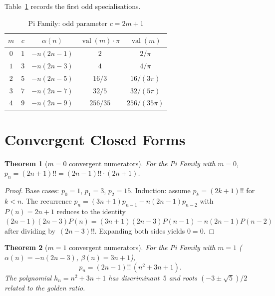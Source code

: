 \documentclass[11pt,a4paper]{article}
\theoremstyle{plain}
\newtheorem{theorem}{Theorem}[section]
\theoremstyle{definition}
\theoremstyle{remark}
\newcommand{\dff}[1]{(#1)!!}
\begin{document}
Table~\ref{tab:pi} records the first odd specialisations.

\begin{table}[ht]
\centering
\caption{Pi Family: odd parameter $c = 2m{+}1$}\label{tab:pi}
\begin{tabular}{@{}ccccc@{}}
\toprule
$m$ & $c$ & $\alpha(n)$ & $\operatorname{val}(m)\cdot\pi$ &
$\operatorname{val}(m)$ \\
\midrule
$0$ & $1$ & $-n(2n{-}1)$ & $2$ & $2/\pi$ \\
$1$ & $3$ & $-n(2n{-}3)$ & $4$ & $4/\pi$ \\
$2$ & $5$ & $-n(2n{-}5)$ & $16/3$ & $16/(3\pi)$ \\
$3$ & $7$ & $-n(2n{-}7)$ & $32/5$ & $32/(5\pi)$ \\
$4$ & $9$ & $-n(2n{-}9)$ & $256/35$ & $256/(35\pi)$ \\
\bottomrule
\end{tabular}
\end{table}

\section{Convergent Closed Forms}\label{sec:closed}

\begin{theorem}[$m=0$ convergent numerators]\label{thm:conv0}
For the Pi Family with $m=0$,
$p_n = (2n{+}1)!! = \dff{2n{-}1}\cdot(2n{+}1)$.
\end{theorem}

\begin{proof}
Base cases: $p_0{=}1$, $p_1{=}3$, $p_2{=}15$.
Induction: assume $p_k = (2k{+}1)!!$ for $k < n$.
The recurrence $p_n = (3n{+}1)p_{n-1} - n(2n{-}1)p_{n-2}$
with $P(n) = 2n{+}1$ reduces to the identity
$(2n{-}1)(2n{-}3)P(n) = (3n{+}1)(2n{-}3)P(n{-}1) - n(2n{-}1)P(n{-}2)$
after dividing by~$\dff{2n{-}3}$.
Expanding both sides yields $0 = 0$.
\end{proof}

\begin{theorem}[$m=1$ convergent numerators]\label{thm:conv1}
For the Pi Family with $m=1$ ($\alpha(n) = -n(2n{-}3)$,
$\beta(n) = 3n{+}1$),
\begin{equation}\label{eq:pn_m1}
  p_n = \dff{2n{-}1}\,(n^2 + 3n + 1).
\end{equation}
The polynomial $h_n = n^2{+}3n{+}1$ \citep{oeis_A028387}
has discriminant~$5$ and
roots $(-3 \pm \sqrt{5})/2$ related to the golden ratio.
\end{theorem}
\end{document}
